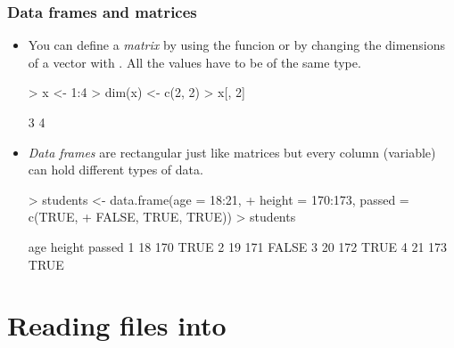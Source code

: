 \begin{frame}
  \frametitle{Data frames and matrices}
  \begin{itemize}
  \item You can define a \emph{matrix} by using the  funcion or by changing the dimensions of a vector with . All the values have to be of the same type.
\begin{Schunk}
\begin{Sinput}
> x <- 1:4
> dim(x) <- c(2, 2)
> x[, 2]
\end{Sinput}
\begin{Soutput}
[1] 3 4
\end{Soutput}
\end{Schunk}
  \item \emph{Data frames} are rectangular just like matrices but every column (variable) can hold different types of data. 
\begin{Schunk}
\begin{Sinput}
> students <- data.frame(age = 18:21, 
+     height = 170:173, passed = c(TRUE, 
+         FALSE, TRUE, TRUE))
> students
\end{Sinput}
\begin{Soutput}
  age height passed
1  18    170   TRUE
2  19    171  FALSE
3  20    172   TRUE
4  21    173   TRUE
\end{Soutput}
\end{Schunk}
  \end{itemize}
\end{frame}


\section{Reading files into }


